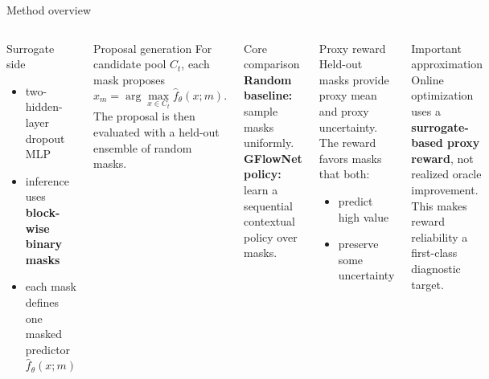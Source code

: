 \documentclass[aspectratio=169]{beamer}
\begin{document}
\begin{frame}{Method overview}
\vspace{-0.55em}
\begin{columns}[T,onlytextwidth]
\begin{minipage}[t][0.80\textheight]{\linewidth}\vspace{0pt}
  \begin{cardA}{Surrogate side}
  \begin{itemize}
    \item two-hidden-layer dropout MLP
    \item inference uses \textbf{block-wise binary masks}
    \item each mask defines one masked predictor $\hat f_\theta(x;m)$
  \end{itemize}
  \end{cardA}

  \vfill

  \begin{card}{Proposal generation}
  For candidate pool $C_t$, each mask proposes
  \[
  x_m=\arg\max_{x\in C_t}\hat f_\theta(x;m).
  \]
  The proposal is then evaluated with a held-out ensemble of random masks.
  \end{card}

  \vfill

  \begin{cardG}{Core comparison}
  \textbf{Random baseline:} sample masks uniformly.\\
  \textbf{GFlowNet policy:} learn a sequential contextual policy over masks.
  \end{cardG}
\end{minipage}

\begin{minipage}[t][0.80\textheight]{\linewidth}\vspace{0pt}
  \begin{card}{Proxy reward}
  Held-out masks provide proxy mean and proxy uncertainty. The reward favors masks that both:
  \begin{itemize}
    \item predict high value
    \item preserve some uncertainty
  \end{itemize}
  \end{card}

  \vfill

  \begin{cardW}{Important approximation}
  Online optimization uses a \textbf{surrogate-based proxy reward}, not realized oracle improvement. This makes reward reliability a first-class diagnostic target.
  \end{cardW}


\end{minipage}
\end{columns}
\end{frame}
\end{document}
